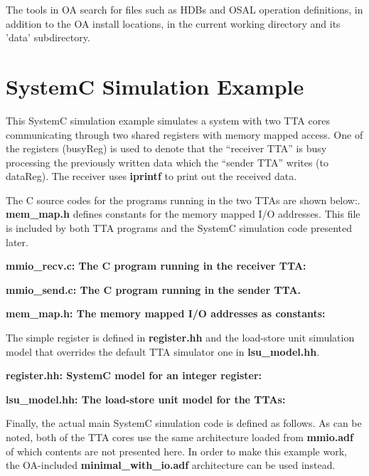 \documentclass[a4paper,twoside]{tceusermanual}
\begin{document}
The tools in OA search for files such as HDBs and OSAL operation definitions,
in addition to the OA install locations, in the current working directory and
its 'data' subdirectory. 

\chapter{SystemC Simulation Example}
\label{appendix:SystemCExample}

This SystemC simulation example simulates a system with two TTA cores
communicating through two shared registers with memory mapped access.
One of the registers (busyReg) is used to denote that the ``receiver TTA'' is
busy processing the previously written data which the ``sender TTA'' writes
(to dataReg). The receiver uses \textbf{iprintf} to print out the received data.

The C source codes for the programs running in the two TTAs 
are shown below:. \textbf{mem\_map.h} defines constants for the memory 
mapped I/O addresses. This file is 
included by both TTA programs and the SystemC simulation code presented
later.

\textbf{mmio\_recv.c: The C program running in the receiver TTA:}



\textbf{mmio\_send.c: The C program running in the sender TTA.}


\textbf{mem\_map.h: The memory mapped I/O addresses as constants:}
 


The simple register is defined in \textbf{register.hh} and the
load-store unit simulation model that overrides the default TTA simulator
one in \textbf{lsu\_model.hh}.

\textbf{register.hh: SystemC model for an integer register:}
 


\textbf{lsu\_model.hh: The load-store unit model for the TTAs:}



Finally, the actual main SystemC simulation code is defined as follows.
As can be noted, both of the TTA cores use the same architecture loaded from
\textbf{mmio.adf} of which contents are not presented here. In order to 
make this example work, the OA-included \textbf{minimal\_with\_io.adf} 
architecture can be used instead.
\end{document}
